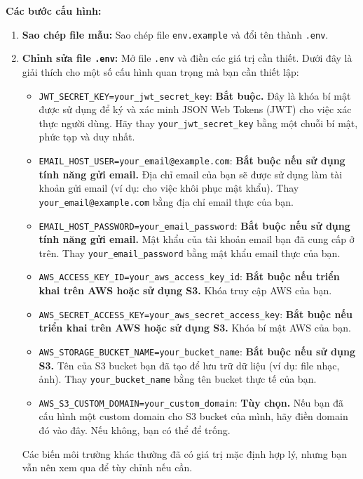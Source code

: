 \textbf{Các bước cấu hình:}
\begin{enumerate}
    \item \textbf{Sao chép file mẫu:} Sao chép file \texttt{env.example} và đổi tên thành \texttt{.env}.
    \item \textbf{Chỉnh sửa file \texttt{.env}:} Mở file \texttt{.env} và điền các giá trị cần thiết. Dưới đây là giải thích cho một số cấu hình quan trọng mà bạn cần thiết lập:
    \begin{itemize}
        \item \texttt{JWT\_SECRET\_KEY=your\_jwt\_secret\_key}: \textbf{Bắt buộc.} Đây là khóa bí mật được sử dụng để ký và xác minh JSON Web Tokens (JWT) cho việc xác thực người dùng. Hãy thay \texttt{your\_jwt\_secret\_key} bằng một chuỗi bí mật, phức tạp và duy nhất.
        \item \texttt{EMAIL\_HOST\_USER=your\_email@example.com}: \textbf{Bắt buộc nếu sử dụng tính năng gửi email.} Địa chỉ email của bạn sẽ được sử dụng làm tài khoản gửi email (ví dụ: cho việc khôi phục mật khẩu). Thay \texttt{your\_email@example.com} bằng địa chỉ email thực của bạn.
        \item \texttt{EMAIL\_HOST\_PASSWORD=your\_email\_password}: \textbf{Bắt buộc nếu sử dụng tính năng gửi email.} Mật khẩu của tài khoản email bạn đã cung cấp ở trên. Thay \texttt{your\_email\_password} bằng mật khẩu email thực của bạn.
        \item \texttt{AWS\_ACCESS\_KEY\_ID=your\_aws\_access\_key\_id}: \textbf{Bắt buộc nếu triển khai trên AWS hoặc sử dụng S3.} Khóa truy cập AWS của bạn.
        \item \texttt{AWS\_SECRET\_ACCESS\_KEY=your\_aws\_secret\_access\_key}: \textbf{Bắt buộc nếu triển khai trên AWS hoặc sử dụng S3.} Khóa bí mật AWS của bạn.
        \item \texttt{AWS\_STORAGE\_BUCKET\_NAME=your\_bucket\_name}: \textbf{Bắt buộc nếu sử dụng S3.} Tên của S3 bucket bạn đã tạo để lưu trữ dữ liệu (ví dụ: file nhạc, ảnh). Thay \texttt{your\_bucket\_name} bằng tên bucket thực tế của bạn.
        \item \texttt{AWS\_S3\_CUSTOM\_DOMAIN=your\_custom\_domain}: \textbf{Tùy chọn.} Nếu bạn đã cấu hình một custom domain cho S3 bucket của mình, hãy điền domain đó vào đây. Nếu không, bạn có thể để trống.
    \end{itemize}
    Các biến môi trường khác thường đã có giá trị mặc định hợp lý, nhưng bạn vẫn nên xem qua để tùy chỉnh nếu cần.
\end{enumerate}


